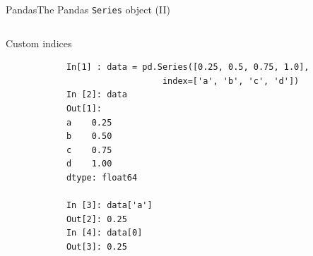\documentclass[10pt,compress]{beamer} %
\begin{document}
\begin{frame}[fragile]{Pandas}{The Pandas \texttt{Series} object (II)}
	\begin{columns}
		\begin{exampleblock}{\footnotesize{Custom indices}}
		\vspace{-0.2cm} 
			\begin{lstlisting}
			In[1] : data = pd.Series([0.25, 0.5, 0.75, 1.0],
			                   index=['a', 'b', 'c', 'd'])
			In [2]: data
			Out[1]: 
			a    0.25
			b    0.50
			c    0.75
			d    1.00
			dtype: float64

			In [3]: data['a']
			Out[2]: 0.25
			In [4]: data[0]
			Out[3]: 0.25
			\end{lstlisting}
		\vspace{-0.2cm} 
		\end{exampleblock}
	\end{columns}
\end{frame}
\end{document}
